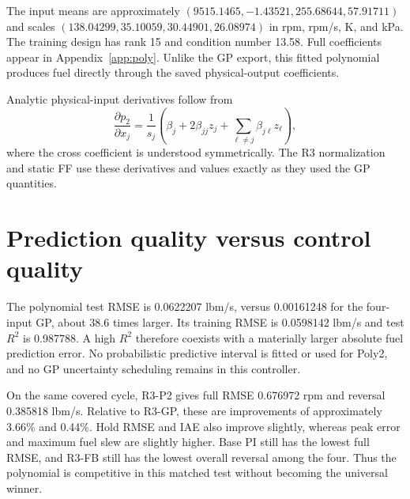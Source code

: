 
The input means are approximately $(9515.1465,-1.43521,255.68644,57.91711)$ and scales $(138.04299,35.10059,30.44901,26.08974)$ in rpm, rpm/s, K, and kPa. The training design has rank 15 and condition number 13.58. Full coefficients appear in Appendix~\ref{app:poly}. Unlike the GP export, this fitted polynomial produces fuel directly through the saved physical-output coefficients.

Analytic physical-input derivatives follow from
\begin{equation}
\frac{\partial p_2}{\partial x_j}=\frac1{s_j}
\left(\beta_j+2\beta_{jj}z_j+\sum_{\ell\ne j}\beta_{j\ell}z_\ell\right),
\end{equation}
where the cross coefficient is understood symmetrically. The R3 normalization and static FF use these derivatives and values exactly as they used the GP quantities.

\section{Prediction quality versus control quality}
The polynomial test RMSE is 0.0622207 lbm/s, versus 0.00161248 for the four-input GP, about 38.6 times larger. Its training RMSE is 0.0598142 lbm/s and test $R^2$ is 0.987788. A high $R^2$ therefore coexists with a materially larger absolute fuel prediction error. No probabilistic predictive interval is fitted or used for Poly2, and no GP uncertainty scheduling remains in this controller.


On the same covered cycle, R3-P2 gives full RMSE 0.676972 rpm and reversal 0.385818 lbm/s. Relative to R3-GP, these are improvements of approximately 3.66\% and 0.44\%. Hold RMSE and IAE also improve slightly, whereas peak error and maximum fuel slew are slightly higher. Base PI still has the lowest full RMSE, and R3-FB still has the lowest overall reversal among the four. Thus the polynomial is competitive in this matched test without becoming the universal winner.


